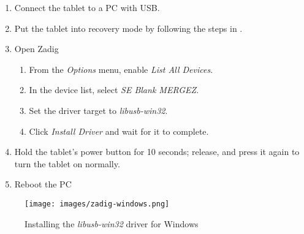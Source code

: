 \begin{enumerate}
  \item{Connect the tablet to a PC with USB.}
\item{Put the tablet into recovery mode by following the steps in .}
\item{Open Zadig}
  \begin{enumerate}
  \item{From the \textit{Options} menu, enable \textit{List All Devices}.}
  \item{In the device list, select \textit{SE Blank MERGEZ}.}
  \item{Set the driver target to \textit{libusb-win32}.}
  \item{Click \textit{Install Driver} and wait for it to complete.}
  \end{enumerate}
\item{Hold the tablet's power button for 10 seconds; release, and press it again to turn the tablet on normally.}
\item{Reboot the PC}
\end{enumerate}

\vfill

\begin{figure}[h]
  \centering
  \texttt{[image: images/zadig-windows.png]}
  \caption{Installing the \textit{libusb-win32} driver for Windows}
  \label{fig:zadigwindows}
\end{figure}

\vfill

